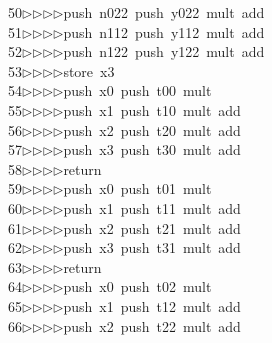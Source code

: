 \begin{tabbing}
50\>$\triangleright$\>$\triangleright$\>$\triangleright$\>$\triangleright$\>push\ n022\ push\ y022\ mult\ add\ \\[0pt]
51\>$\triangleright$\>$\triangleright$\>$\triangleright$\>$\triangleright$\>push\ n112\ push\ y112\ mult\ add\ \\[0pt]
52\>$\triangleright$\>$\triangleright$\>$\triangleright$\>$\triangleright$\>push\ n122\ push\ y122\ mult\ add\ \\[0pt]
53\>$\triangleright$\>$\triangleright$\>$\triangleright$\>$\triangleright$\>store\ x3\ \\[0pt]
54\>$\triangleright$\>$\triangleright$\>$\triangleright$\>$\triangleright$\>push\ x0\ push\ t00\ mult\ \\[0pt]
55\>$\triangleright$\>$\triangleright$\>$\triangleright$\>$\triangleright$\>push\ x1\ push\ t10\ mult\ add\ \\[0pt]
56\>$\triangleright$\>$\triangleright$\>$\triangleright$\>$\triangleright$\>push\ x2\ push\ t20\ mult\ add\ \\[0pt]
57\>$\triangleright$\>$\triangleright$\>$\triangleright$\>$\triangleright$\>push\ x3\ push\ t30\ mult\ add\ \\[0pt]
58\>$\triangleright$\>$\triangleright$\>$\triangleright$\>$\triangleright$\>return\ \\[0pt]
59\>$\triangleright$\>$\triangleright$\>$\triangleright$\>$\triangleright$\>push\ x0\ push\ t01\ mult\ \\[0pt]
60\>$\triangleright$\>$\triangleright$\>$\triangleright$\>$\triangleright$\>push\ x1\ push\ t11\ mult\ add\ \\[0pt]
61\>$\triangleright$\>$\triangleright$\>$\triangleright$\>$\triangleright$\>push\ x2\ push\ t21\ mult\ add\ \\[0pt]
62\>$\triangleright$\>$\triangleright$\>$\triangleright$\>$\triangleright$\>push\ x3\ push\ t31\ mult\ add\ \\[0pt]
63\>$\triangleright$\>$\triangleright$\>$\triangleright$\>$\triangleright$\>return\ \\[0pt]
64\>$\triangleright$\>$\triangleright$\>$\triangleright$\>$\triangleright$\>push\ x0\ push\ t02\ mult\ \\[0pt]
65\>$\triangleright$\>$\triangleright$\>$\triangleright$\>$\triangleright$\>push\ x1\ push\ t12\ mult\ add\ \\[0pt]
66\>$\triangleright$\>$\triangleright$\>$\triangleright$\>$\triangleright$\>push\ x2\ push\ t22\ mult\ add\ \\[0pt]

\end{tabbing}
